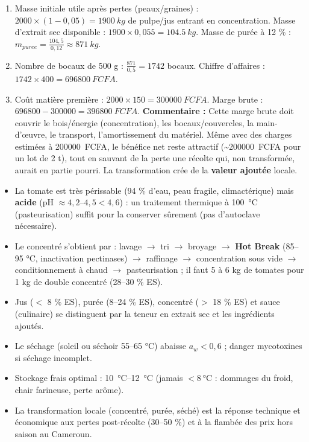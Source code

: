 \documentclass[11pt]{article}
\begin{document}
\begin{corrige}
\begin{enumerate}
\item Masse initiale utile après pertes (peaux/graines) : $2000 \times (1 - 0,05) = \SI{1900}{kg}$ de pulpe/jus entrant en concentration.
Masse d'extrait sec disponible : $1900 \times 0,055 = \SI{104,5}{kg}$.
Masse de purée à 12 \% : $m_{puree} = \frac{104,5}{0,12} \approx \SI{871}{kg}$.
\item Nombre de bocaux de 500 g : $\frac{871}{0,5} = 1742$ bocaux.
Chiffre d'affaires : $1742 \times 400 = \SI{696800}{FCFA}$.
\item Coût matière première : $2000 \times 150 = \SI{300000}{FCFA}$.
Marge brute : $696800 - 300000 = \SI{396800}{FCFA}$.
\textbf{Commentaire :} Cette marge brute doit couvrir le bois/énergie (concentration), les bocaux/couvercles, la main-d'œuvre, le transport, l'amortissement du matériel. Même avec des charges estimées à \SI{200000}{FCFA}, le bénéfice net reste attractif (\textasciitilde \SI{200000}{FCFA} pour un lot de 2 t), tout en sauvant de la perte une récolte qui, non transformée, aurait en partie pourri. La transformation crée de la \textbf{valeur ajoutée} locale.
\end{enumerate}
\end{corrige}

\begin{aretenir}
\begin{itemize}
\item La tomate est très périssable (94 \% d'eau, peau fragile, climactérique) mais \textbf{acide} (pH $\approx 4,2$--$4,5 < 4,6$) : un traitement thermique à \SI{100}{\celsius} (pasteurisation) suffit pour la conserver sûrement (pas d'autoclave nécessaire).
\item Le concentré s'obtient par : lavage $\to$ tri $\to$ broyage $\to$ \textbf{Hot Break} (85--95 °C, inactivation pectinases) $\to$ raffinage $\to$ concentration sous vide $\to$ conditionnement à chaud $\to$ pasteurisation ; il faut 5 à 6 kg de tomates pour 1 kg de double concentré (28--30 \% ES).
\item Jus ($<$ 8 \% ES), purée (8--24 \% ES), concentré ($>$ 18 \% ES) et sauce (culinaire) se distinguent par la teneur en extrait sec et les ingrédients ajoutés.
\item Le séchage (soleil ou séchoir 55--65 °C) abaisse $a_w < 0,6$ ; danger mycotoxines si séchage incomplet.
\item Stockage frais optimal : \SI{10}{\celsius}--\SI{12}{\celsius} (jamais $< \SI{8}{\celsius}$ : dommages du froid, chair farineuse, perte arôme).
\item La transformation locale (concentré, purée, séché) est la réponse technique et économique aux pertes post-récolte (30--50 \%) et à la flambée des prix hors saison au Cameroun.
\end{itemize}
\end{aretenir}
\end{document}
